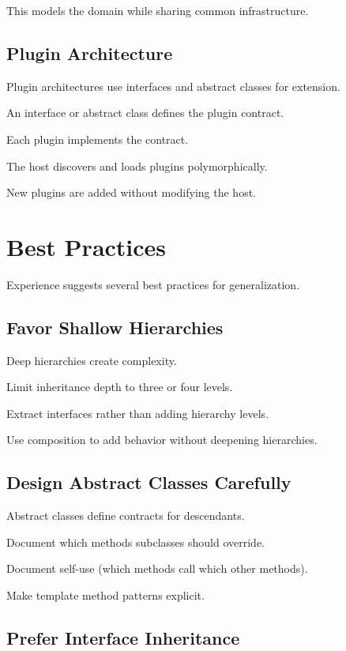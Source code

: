 \documentclass[11pt]{article}
\begin{document}
This models the domain while sharing common infrastructure.

\subsection{Plugin Architecture}

Plugin architectures use interfaces and abstract classes for extension.

An interface or abstract class defines the plugin contract.

Each plugin implements the contract.

The host discovers and loads plugins polymorphically.

New plugins are added without modifying the host.

\section{Best Practices}

Experience suggests several best practices for generalization.

\subsection{Favor Shallow Hierarchies}

Deep hierarchies create complexity.

Limit inheritance depth to three or four levels.

Extract interfaces rather than adding hierarchy levels.

Use composition to add behavior without deepening hierarchies.

\subsection{Design Abstract Classes Carefully}

Abstract classes define contracts for descendants.

Document which methods subclasses should override.

Document self-use (which methods call which other methods).

Make template method patterns explicit.

\subsection{Prefer Interface Inheritance}
\end{document}

